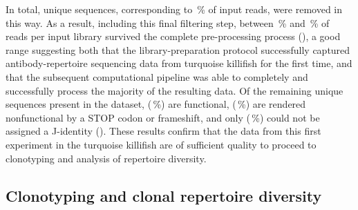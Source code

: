 In total,  unique sequences, corresponding to \,\% of input reads, were removed in this way. As a result, including this final filtering step, between \,\% and \,\% of reads per input library survived the complete pre-processing process (), a good range suggesting both that the library-preparation protocol successfully captured antibody-repertoire sequencing data from turquoise killifish for the first time, and that the subsequent computational pipeline was able to completely and successfully process the majority of the resulting data. Of the remaining  unique sequences present in the dataset,  (\,\%) are functional,  (\,\%) are rendered nonfunctional by a STOP codon or frameshift, and only  (\,\%) could not be assigned a J-identity (). These results confirm that the data from this first \igseq experiment in the turquoise killifish are of sufficient quality to proceed to clonotyping and analysis of repertoire diversity.

\subsection{Clonotyping and clonal repertoire diversity}
\label{sec:igseq_pilot_clones}

